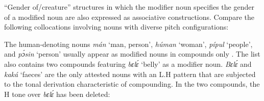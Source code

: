 “Gender of/creature” structures in which the modifier noun specifies the gender of a modified noun are also expressed as associative constructions. Compare the following collocations involving nouns with diverse pitch configurations: 

The human-denoting nouns \textit{mán} ‘man, person’, \textit{húman} ‘woman’, \textit{pípul} ‘people’, and \textit{pɔ́sin} ‘person’ usually appear as modified nouns in compounds only . The list also contains two compounds featuring \textit{bɛlɛ́} ‘belly’ as a modifier noun. \textit{Bɛlɛ́} and \textit{kaká} ‘faeces’ are the only attested nouns with an L.H pattern that are subjected to the tonal derivation characteristic of compounding. In the two compounds, the H tone over \textit{bɛlɛ́} has been deleted: 

